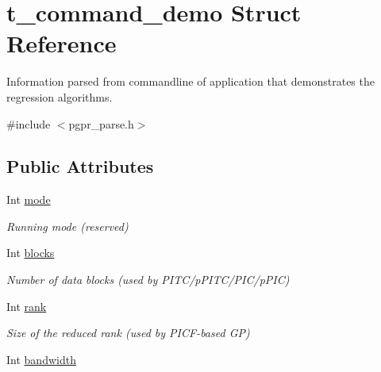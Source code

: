 \hypertarget{structt__command__demo}{\section{t\+\_\+command\+\_\+demo Struct Reference}
\label{structt__command__demo}
}


Information parsed from commandline of application that demonstrates the regression algorithms.  




{\ttfamily \#include $<$pgpr\+\_\+parse.\+h$>$}

\subsection*{Public Attributes}
\begin{DoxyCompactItemize}
\item 
\hypertarget{structt__command__demo_ac45fbb0d03acb8884ce904e82b82e5bc}{Int \hyperlink{structt__command__demo_ac45fbb0d03acb8884ce904e82b82e5bc}{mode}}\label{structt__command__demo_ac45fbb0d03acb8884ce904e82b82e5bc}

\begin{DoxyCompactList}\small\item\em Running mode (reserved) \end{DoxyCompactList}\item 
\hypertarget{structt__command__demo_a26890a40c95b0bcf54cc69b11f802dda}{Int \hyperlink{structt__command__demo_a26890a40c95b0bcf54cc69b11f802dda}{blocks}}\label{structt__command__demo_a26890a40c95b0bcf54cc69b11f802dda}

\begin{DoxyCompactList}\small\item\em Number of data blocks (used by P\+I\+T\+C/p\+P\+I\+T\+C/\+P\+I\+C/p\+P\+I\+C) \end{DoxyCompactList}\item 
\hypertarget{structt__command__demo_a287322538dd7b8f950eeedba17a9a590}{Int \hyperlink{structt__command__demo_a287322538dd7b8f950eeedba17a9a590}{rank}}\label{structt__command__demo_a287322538dd7b8f950eeedba17a9a590}

\begin{DoxyCompactList}\small\item\em Size of the reduced rank (used by P\+I\+C\+F-\/based G\+P) \end{DoxyCompactList}\item 
\hypertarget{structt__command__demo_af9e6d60a117f951bb76e4d30b9a179a4}{Int \hyperlink{structt__command__demo_af9e6d60a117f951bb76e4d30b9a179a4}{bandwidth}}\label{structt__command__demo_af9e6d60a117f951bb76e4d30b9a179a4}


\end{DoxyCompactItemize}

